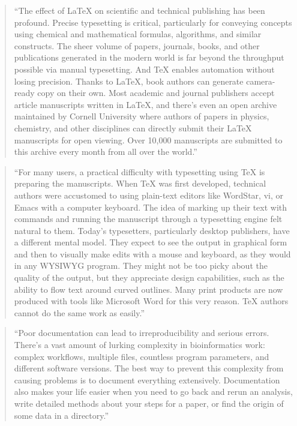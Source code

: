 \documentclass[]{tufte-book}
\begin{document}
\begin{quote}
``The effect of LaTeX on scientific and technical publishing has been profound.
Precise typesetting is critical, particularly for conveying concepts using
chemical and mathematical formulas, algorithms, and similar constructs. The
sheer volume of papers, journals, books, and other publications generated in the
modern world is far beyond the throughput possible via manual typesetting. And
TeX enables automation without losing precision. Thanks to LaTeX, book authors
can generate camera-ready copy on their own. Most academic and journal
publishers accept article manuscripts written in LaTeX, and there's even an open
archive maintained by Cornell University where authors of papers in physics,
chemistry, and other disciplines can directly submit their LaTeX manuscripts for
open viewing. Over 10,000 manuscripts are submitted to this archive every month
from all over the world.'' \citep{apte2019lingua}
\end{quote}

\begin{quote}
``For many users, a practical difficulty with typesetting using TeX is
preparing the manuscripts. When TeX was first developed, technical authors were
accustomed to using plain-text editors like WordStar, vi, or Emacs with a
computer keyboard. The idea of marking up their text with commands and running
the manuscript through a typesetting engine felt natural to them. Today's
typesetters, particularly desktop publishers, have a different mental model.
They expect to see the output in graphical form and then to visually make edits
with a mouse and keyboard, as they would in any WYSIWYG program. They might not
be too picky about the quality of the output, but they appreciate design
capabilities, such as the ability to flow text around curved outlines. Many
print products are now produced with tools like Microsoft Word for this very
reason. TeX authors cannot do the same work as easily.'' \citep{apte2019lingua}
\end{quote}

\begin{quote}
``Poor documentation can lead to irreproducibility and serious errors. There's
a vast amount of lurking complexity in bioinformatics work: complex workflows,
multiple files, countless program parameters, and different software versions.
The best way to prevent this complexity from causing problems is to document
everything extensively. Documentation also makes your life easier when you need to
go back and rerun an analysis, write detailed methods about your steps for a
paper, or find the origin of some data in a directory.'' \citep{buffalo2015bioinformatics}
\end{quote}
\end{document}
